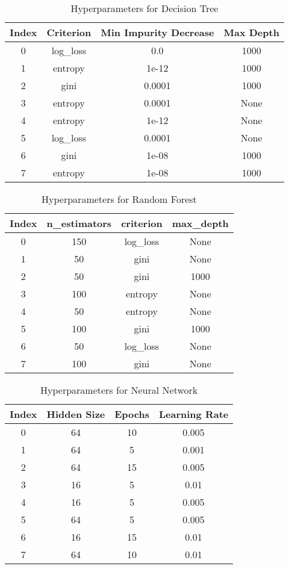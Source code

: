 \begin{table*}
    \centering
    \begin{tabular}{@{}cccc@{}}
        \toprule
        \textbf{Index} & \textbf{Criterion} & \textbf{Min Impurity Decrease} & \textbf{Max Depth} \\ \midrule
        0 & log\_loss & 0.0 & 1000 \\
        1 & entropy & 1e-12 & 1000 \\
        2 & gini & 0.0001 & 1000 \\
        3 & entropy & 0.0001 & None \\
        4 & entropy & 1e-12 & None \\
        5 & log\_loss & 0.0001 & None \\
        6 & gini & 1e-08 & 1000 \\
        7 & entropy & 1e-08 & 1000 \\ \bottomrule
    \end{tabular}
    \caption{Hyperparameters for Decision Tree}
    \label{tab:dt_search_spaces}
\end{table*}


\begin{table*}
    \centering
    \begin{tabular}{@{}cccc@{}}
        \toprule
        \textbf{Index} & \textbf{n\_estimators} & \textbf{criterion} & \textbf{max\_depth} \\ \midrule
        0 & 150 & log\_loss & None \\
        1 & 50 & gini & None \\
        2 & 50 & gini & 1000 \\
        3 & 100 & entropy & None \\
        4 & 50 & entropy & None \\
        5 & 100 & gini & 1000 \\
        6 & 50 & log\_loss & None \\
        7 & 100 & gini & None \\ \bottomrule
    \end{tabular}
    \caption{Hyperparameters for Random Forest}
    \label{tab:rf_search_spaces}
\end{table*}

\begin{table*}
    \centering
    \begin{tabular}{@{}cccc@{}}
        \toprule
        \textbf{Index} & \textbf{Hidden Size} & \textbf{Epochs} & \textbf{Learning Rate} \\ \midrule
        0 & 64 & 10 & 0.005 \\
        1 & 64 & 5 & 0.001 \\
        2 & 64 & 15 & 0.005 \\
        3 & 16 & 5 & 0.01 \\
        4 & 16 & 5 & 0.005 \\
        5 & 64 & 5 & 0.005 \\
        6 & 16 & 15 & 0.01 \\
        7 & 64 & 10 & 0.01 \\ \bottomrule
    \end{tabular}
    \caption{Hyperparameters for Neural Network}
    \label{tab:nn_search_spaces}
\end{table*}
